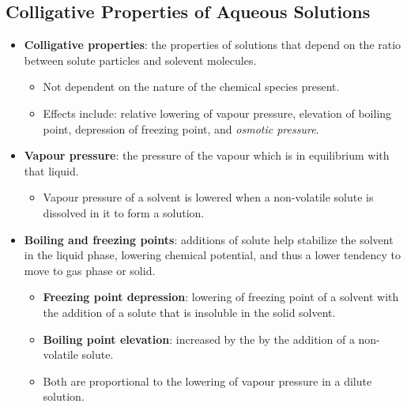 \documentclass[12pt,a4paper]{article}
\begin{document}
\subsection{Colligative Properties of Aqueous Solutions}
\begin{itemize}
    \item \textbf{Colligative properties}: the properties of solutions that depend on the {\color{o-Sun}ratio} between solute particles and solevent molecules.
        \begin{itemize}
            \item Not dependent on the nature of the chemical species present.
            \item Effects include: relative lowering of vapour pressure, elevation of boiling point, depression of freezing point, and \textit{osmotic pressure}.
        \end{itemize}
    \item \textbf{Vapour pressure}: the pressure of the vapour which is in equilibrium with that liquid.
        \begin{itemize}
            \item Vapour pressure of a solvent is lowered when a non-volatile solute is dissolved in it to form a solution.
        \end{itemize}
    \item \textbf{Boiling and freezing points}: additions of solute help stabilize the solvent in the liquid phase, lowering chemical potential, and thus a lower tendency to move to gas phase or solid.
        \begin{itemize}
            \item \textbf{Freezing point depression}: lowering of freezing point of a solvent with the addition of a solute that is insoluble in the solid solvent.
            \item \textbf{Boiling point elevation}: increased by the by the addition of a non-volatile solute.
            \item Both are proportional to the lowering of vapour pressure in a dilute solution. 
        \end{itemize}
\end{itemize}
\end{document}
